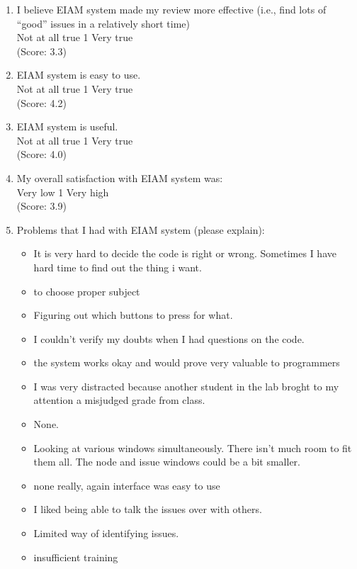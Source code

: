 \begin{enumerate}
\item  I believe EIAM system made my review more effective
(i.e., find lots of ``good'' issues in a relatively short time)
\\
Not at all true \hfill 1     \hfill Very true\\
(Score: 3.3)

\item  EIAM system is easy to use.
\\
Not at all true \hfill 1     \hfill Very true\\
(Score: 4.2)

\item  EIAM system is useful. 
\\
Not at all true \hfill 1     \hfill Very true\\
(Score: 4.0)

\item  My overall satisfaction with EIAM system was:
\\
Very low \hfill 1     \hfill Very high\\
(Score: 3.9)

\item  Problems that I had with EIAM system (please explain): 
\begin{itemize}
\item It is very hard to decide the code is right or wrong.  Sometimes I
have hard time to find out the thing i want.
\item to choose proper subject
\item Figuring out which buttons to press for what.
\item I couldn't verify my doubts when I had questions on the  code.  
\item the system works okay and would prove very valuable to programmers
\item I was very distracted because another student in the lab broght to my
attention a misjudged grade from class.
\item None.
\item Looking at various windows simultaneously.  There isn't much room to
fit them all.  The node and issue windows could be a bit smaller.

\item none really, again interface was easy to use
\item I liked being able to talk the issues over with others.
\item Limited way of identifying issues.
\item insufficient training


\end{itemize}
\end{enumerate}
